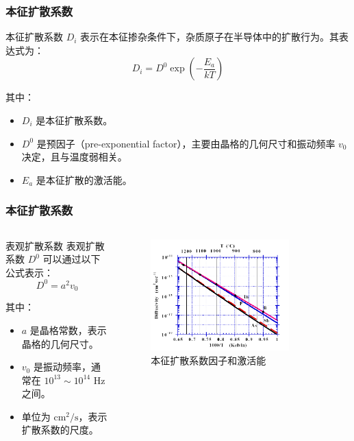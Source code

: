 \documentclass[xcolor=table,dvipsnames,svgnames,aspectratio=169]{ctexbeamer}
\begin{document}
\begin{frame}
  \frametitle{本征扩散系数}

  本征扩散系数 \( D_i \) 表示在本征掺杂条件下，杂质原子在半导体中的扩散行为。其表达式为：
  \[ D_i = D^{0} \exp\left(-\frac{E_a}{kT}\right) \]

  其中：
  \begin{itemize}
    \item \( D_i \) 是本征扩散系数。
    \item \( D^0 \) 是预因子（pre-exponential factor），主要由晶格的几何尺寸和振动频率 \( v_0 \) 决定，且与温度弱相关。
    \item \( E_a \) 是本征扩散的激活能。
  \end{itemize}

\end{frame}

\begin{frame}
  \frametitle{本征扩散系数}
  
  \begin{columns}
    \begin{column}{0.7\textwidth}
      \begin{block}{表观扩散系数}
        表观扩散系数 \( D^0 \) 可以通过以下公式表示：
        \[ D^0 = a^2 v_0 \]
        
        其中：
        \begin{itemize}
          \item \( a \) 是晶格常数，表示晶格的几何尺寸。
          \item \( v_0 \) 是振动频率，通常在 \( 10^{13} \sim 10^{14} \) Hz 之间。
          \item 单位为 \( \mathrm{cm^2/s} \)，表示扩散系数的尺度。
        \end{itemize}
      \end{block}
    \end{column}
    \begin{column}{0.3\textwidth}
      \begin{figure}
        \centering
        \includegraphics[width=0.8\textwidth]{本征扩散系数因子和激活能.png}
        \caption{本征扩散系数因子和激活能}
      \end{figure}
    \end{column}
  \end{columns}



\end{frame}
    
\end{document}
